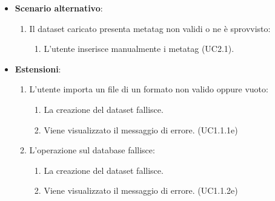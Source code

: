\begin{itemize}
    \item \textbf{Scenario alternativo}:
		\begin{enumerate}
            \item Il dataset caricato presenta metatag non validi o ne è sprovvisto:
            \begin{enumerate}
                \item L'utente inserisce manualmente i metatag (UC2.1).
            \end{enumerate}
        \end{enumerate}
    \item \textbf{Estensioni}:
        \begin{enumerate}
            \item L'utente importa un file di un formato non valido oppure vuoto:
            \begin{enumerate}
                \item La creazione del dataset fallisce.
                \item Viene visualizzato il messaggio di errore. (UC1.1.1e)
            \end{enumerate}
            \item L'operazione sul database fallisce:
            \begin{enumerate}
                \item La creazione del dataset fallisce.
                \item Viene visualizzato il messaggio di errore. (UC1.1.2e)
            \end{enumerate}
        \end{enumerate}
\end{itemize}


